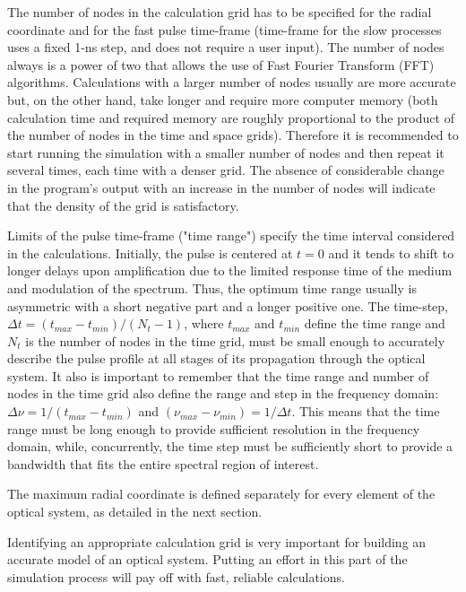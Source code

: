 \documentclass{report}
\begin{document}
The number of nodes in the calculation grid has to be specified for the radial coordinate and for the fast pulse time-frame (time-frame for the slow processes uses a fixed 1-ns step, and does not require a user input). The number of nodes always is a power of two that allows the use of Fast Fourier Transform (FFT) algorithms. Calculations with a larger number of nodes  usually are more accurate but, on the other hand, take longer and require more computer memory (both calculation time and required memory are roughly proportional to the product of the number of  nodes in the time and space grids). Therefore it  is recommended to start  running the simulation with a smaller number of nodes and then repeat it several times, each time with a denser grid. The absence of considerable change in the program’s output with an increase in the number of nodes will indicate that the density of the grid is satisfactory.

Limits of the pulse time-frame ("time range") specify the time interval considered in the calculations. Initially, the pulse is centered at $t=0$ and it tends to shift to longer delays upon amplification due to the limited response time of the medium and modulation of the spectrum. Thus, the optimum time range usually is asymmetric with a short negative part and a longer positive one. The time-step, $\Delta t=(t_{max}-t_{min})/(N_t-1)$, where $t_{max}$ and $t_{min}$ define the time range and $N_t$ is the number of nodes in the time grid, must be small enough to accurately describe the pulse profile at all stages of its  propagation through the optical system. It also is important to remember that the time range and number of nodes in the time grid also define the range and step in the frequency domain: $\Delta\nu=1/(t_{max}-t_{min})$ and $(\nu_{max}-\nu_{min})=1/\Delta t$. This means that the time range must be long enough to provide sufficient resolution in the frequency domain, while, concurrently, the time step must be sufficiently short to provide a bandwidth that fits the entire spectral region of interest.

The maximum radial coordinate is defined separately for every element of the optical system, as detailed in the next section.

Identifying an appropriate calculation grid is very important for building an accurate model of an optical system. Putting an effort in this part of the simulation process will pay off with fast, reliable calculations.
\end{document}
